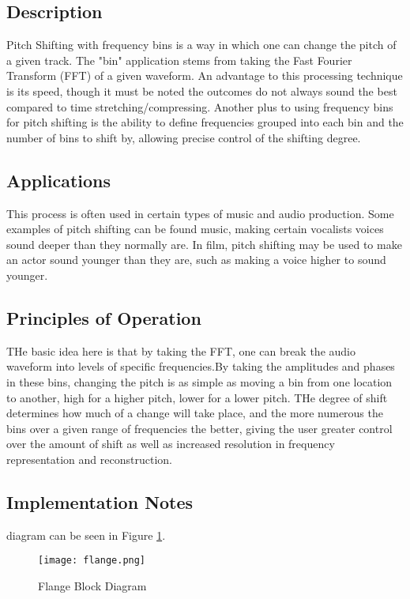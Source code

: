 \subsection{Description}
Pitch Shifting with frequency bins is a way in which one can change the pitch of a given track. The "bin" application stems from taking the Fast Fourier Transform (FFT) of a given waveform. An advantage to this processing technique is its speed, though it must be noted the outcomes do not always sound the best compared to time stretching/compressing. Another plus to using frequency bins for pitch shifting is the ability to define frequencies grouped into each bin and the number of bins to shift by, allowing precise control of the shifting degree.

\subsection{Applications}
This process is often used in certain types of music and audio production. Some examples of pitch shifting can be found music, making certain vocalists voices sound deeper than they normally are. In film, pitch shifting may be used to make an actor sound younger than they are, such as making a voice higher to sound younger. 

\subsection{Principles of Operation}
THe basic idea here is that by taking the FFT, one can break the audio waveform into levels of specific frequencies.By taking the amplitudes and phases in these bins, changing the pitch is as simple as moving a bin from one location to another, high for a higher pitch, lower for a lower pitch. THe degree of shift determines how much of a change will take place, and the more numerous the bins over a given range of frequencies the better, giving the user greater control over the amount of shift as well as increased resolution in frequency representation and reconstruction.

\subsection{Implementation Notes}
diagram can be seen in Figure \ref{fig:flange-block-diagram}.
\begin{figure}[ht]
	\centering
	\texttt{[image: flange.png]}
	\caption{Flange Block Diagram}
	\label{fig:flange-block-diagram}
\end{figure}

